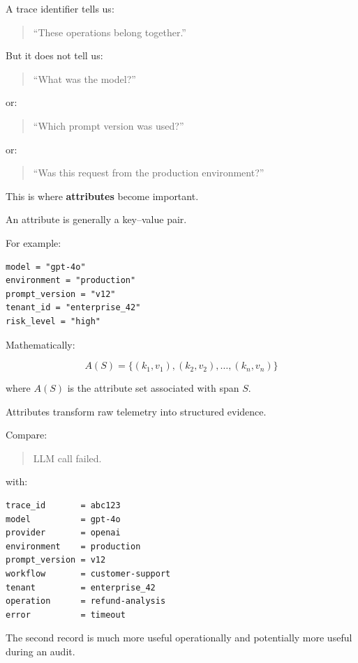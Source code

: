 \documentclass[11pt,a4paper]{article}
\begin{document}
A trace identifier tells us:

\begin{quote}
``These operations belong together.''
\end{quote}

But it does not tell us:

\begin{quote}
``What was the model?''
\end{quote}

or:

\begin{quote}
``Which prompt version was used?''
\end{quote}

or:

\begin{quote}
``Was this request from the production environment?''
\end{quote}

This is where \textbf{attributes} become important.

An attribute is generally a key--value pair.

For example:

\begin{lstlisting}
model = "gpt-4o"
environment = "production"
prompt_version = "v12"
tenant_id = "enterprise_42"
risk_level = "high"
\end{lstlisting}

Mathematically:

\[
A(S) = \{ (k_1,v_1), (k_2,v_2), \ldots, (k_n,v_n) \}
\]

where $A(S)$ is the attribute set associated with span $S$.

Attributes transform raw telemetry into structured evidence.

Compare:

\begin{quote}
LLM call failed.
\end{quote}

with:

\begin{lstlisting}
trace_id       = abc123
model          = gpt-4o
provider       = openai
environment    = production
prompt_version = v12
workflow       = customer-support
tenant         = enterprise_42
operation      = refund-analysis
error          = timeout
\end{lstlisting}

The second record is much more useful operationally and potentially more useful during an audit.
\end{document}
